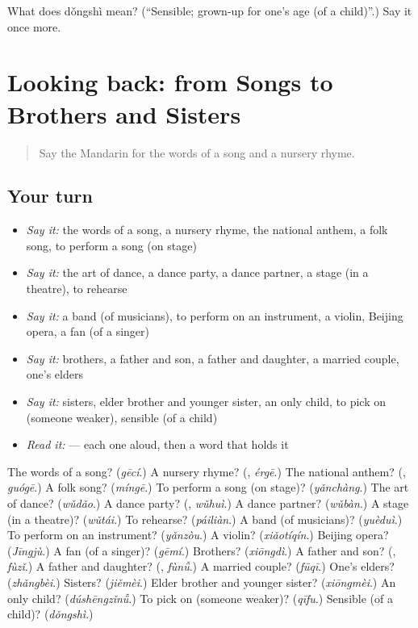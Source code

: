 \begin{tcolorbox}[breakable,colback=teal!4,colframe=teal!35!black,title={Before you move on}]
What does dǒngshì mean? (\textquotedblleft{}Sensible; grown-up for one's age (of a child)\textquotedblright{}.) Say it once more.
\end{tcolorbox}
\section[(dialogue)]{Looking back: from Songs to Brothers and Sisters}

\label{lesson:ZH-R508-review-504-508}



\begin{quote}
Say the Mandarin for the words of a song and a nursery rhyme.
\end{quote}

\subsection*{Your turn}
\begin{itemize}
\raggedright
  \item \emph{Say it:} the words of a song, a nursery rhyme, the national anthem, a folk song, to perform a song (on stage)
  \item \emph{Say it:} the art of dance, a dance party, a dance partner, a stage (in a theatre), to rehearse
  \item \emph{Say it:} a band (of musicians), to perform on an instrument, a violin, Beijing opera, a fan (of a singer)
  \item \emph{Say it:} brothers, a father and son, a father and daughter, a married couple, one's elders
  \item \emph{Say it:} sisters, elder brother and younger sister, an only child, to pick on (someone weaker), sensible (of a child)
  \item \emph{Read it:}    — each one aloud, then a word that holds it
\end{itemize}

\begin{tcolorbox}[breakable,colback=teal!4,colframe=teal!35!black,title={Before you move on}]
The words of a song? (\emph{gēcí}.) A nursery rhyme? (\textbf{}, \emph{érgē}.) The national anthem? (\textbf{}, \emph{guógē}.) A folk song? (\emph{míngē}.) To perform a song (on stage)? (\emph{yǎnchàng}.) The art of dance? (\emph{wǔdǎo}.) A dance party? (\textbf{}, \emph{wǔhuì}.) A dance partner? (\emph{wǔbàn}.) A stage (in a theatre)? (\emph{wǔtái}.) To rehearse? (\emph{páiliàn}.) A band (of musicians)? (\emph{yuèduì}.) To perform on an instrument? (\emph{yǎnzòu}.) A violin? (\emph{xiǎotíqín}.) Beijing opera? (\emph{Jīngjù}.) A fan (of a singer)? (\emph{gēmí}.) Brothers? (\emph{xiōngdì}.) A father and son? (\textbf{}, \emph{fùzǐ}.) A father and daughter? (\textbf{}, \emph{fùnǚ}.) A married couple? (\emph{fūqī}.) One's elders? (\emph{zhǎngbèi}.) Sisters? (\emph{jiěmèi}.) Elder brother and younger sister? (\emph{xiōngmèi}.) An only child? (\emph{dúshēngzǐnǚ}.) To pick on (someone weaker)? (\emph{qīfu}.) Sensible (of a child)? (\emph{dǒngshì}.)
\end{tcolorbox}
